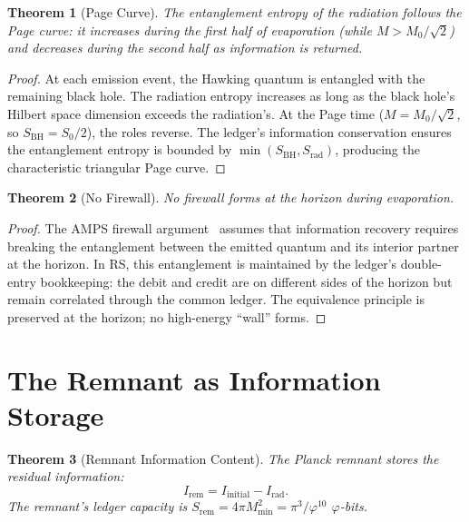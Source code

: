 \documentclass[12pt,a4paper]{article}
\newtheorem{theorem}{Theorem}[section]
\theoremstyle{definition}
\theoremstyle{remark}
\begin{document}
\begin{theorem}[Page Curve]
\label{thm:page}
The entanglement entropy of the radiation follows the Page curve:
it increases during the first half of evaporation (while $M >
M_0/\sqrt{2}$) and decreases during the second half as information
is returned.
\end{theorem}

\begin{proof}
At each emission event, the Hawking quantum is entangled with the
remaining black hole.  The radiation entropy increases as long as
the black hole's Hilbert space dimension exceeds the radiation's.
At the Page time ($M = M_0/\sqrt{2}$, so $S_{\mathrm{BH}} =
S_0/2$), the roles reverse.  The ledger's information conservation
ensures the entanglement entropy is bounded by $\min(S_{\mathrm{BH}},
S_{\mathrm{rad}})$, producing the characteristic triangular Page
curve.
\end{proof}

\begin{theorem}[No Firewall]
No firewall forms at the horizon during evaporation.
\end{theorem}

\begin{proof}
The AMPS firewall argument~\cite{AMPS2013} assumes that information
recovery requires breaking the entanglement between the emitted
quantum and its interior partner at the horizon.  In RS, this
entanglement is maintained by the ledger's double-entry bookkeeping:
the debit and credit are on different sides of the horizon but remain
correlated through the common ledger.  The equivalence principle is
preserved at the horizon; no high-energy ``wall'' forms.
\end{proof}

\section{The Remnant as Information Storage}
\label{sec:storage}

\begin{theorem}[Remnant Information Content]
The Planck remnant stores the residual information:
\begin{equation}
  I_{\mathrm{rem}} = I_{\mathrm{initial}} - I_{\mathrm{rad}}.
\end{equation}
The remnant's ledger capacity is
$S_{\mathrm{rem}} = 4\pi M_{\mathrm{min}}^2 = \pi^3/\varphi^{10}$
$\varphi$-bits.
\end{theorem}
\end{document}
